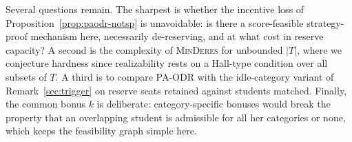 \documentclass[a4paper,twoside]{article}
\theoremstyle{definition}
\begin{document}





Several questions remain. The sharpest is whether the incentive loss of Proposition~\ref{prop:paodr-notsp} is unavoidable: is there a score-feasible strategy-proof mechanism here, necessarily de-reserving, and at what cost in reserve capacity? A second is the complexity of \textsc{MinDeres} for unbounded $|T|$, where we conjecture hardness since realizability rests on a Hall-type condition over all subsets of $T$. A third is to compare PA-ODR with the idle-category variant of Remark~\ref{sec:trigger} on reserve seats retained against students matched. Finally, the common bonus $k$ is deliberate: category-specific bonuses would break the property that an overlapping student is admissible for all her categories or none, which keeps the feasibility graph simple here.
\end{document}
